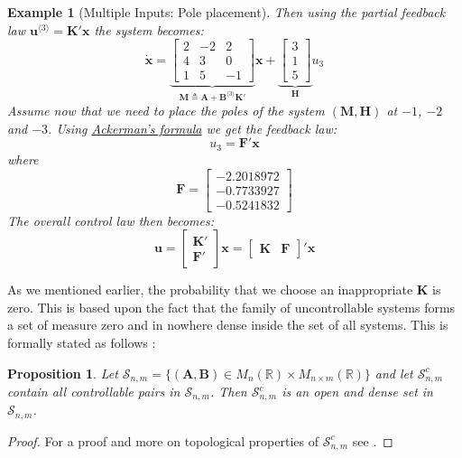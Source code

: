 \documentclass[a4paper,10pt,oneside]{book}
\newtheorem{example}{Example}
\newtheorem{proposition}[theorem]{Proposition}
\begin{document}
\begin{example}[Multiple Inputs: Pole placement]
Then using the partial feedback law $\mathbf{u}^{\langle3 \rangle}=\mathbf{K}'\mathbf{x}$ the system becomes:
\begin{equation}
 \dot{\mathbf{x}}=\underbrace{\left[ {\begin{array}{ccc}
      2&-2&2\\4&3&0\\1&5&-1
\end{array} } \right]}_{\mathbf{M}\triangleq\mathbf{A}+\mathbf{B}^{\langle3 \rangle}\mathbf{K}'}\mathbf{x}+\underbrace{\left[ {\begin{array}{c}     
3\\1\\5
\end{array} } \right]}_{\mathbf{H}}u_3
\end{equation}
Assume now that we need to place the poles of the system $(\mathbf{M},\mathbf{H})$ at $-1$, $-2$ and $-3$. Using \hyperlink{prop:AckermansFormula}{Ackerman's formula} we get the feedback law:
\begin{equation}
 u_3=\mathbf{F}'\mathbf{x}
\end{equation}
where
\begin{equation}
 \mathbf{F}=\left[ {\begin{array}{c}
      -2.2018972\\
      -0.7733927\\
      -0.5241832
\end{array} } \right]
\end{equation}
The overall control law then becomes:
\begin{equation}
 \mathbf{u}=\left[ {\begin{array}{c}
      \mathbf{K}' \\ \mathbf{F}'
\end{array} } \right]\mathbf{x}=\left[ {\begin{array}{cc}
      \mathbf{K} & \mathbf{F}
\end{array} } \right]'\mathbf{x}
\end{equation}
\end{example}
As we mentioned earlier, the probability that we choose an inappropriate $\mathbf{K}$ is zero. This is based upon the fact that the family of uncontrollable systems forms a set of measure zero and in nowhere dense inside the set of all systems. This is formally stated as follows \cite{Son98}:
\begin{proposition}
 Let $\mathcal{S}_{n,m}=\{(\mathbf{A},\mathbf{B})\in M_{n}(\mathbb{R})\times M_{n\times m}(\mathbb{R})\}$ and let $\mathcal{S}_{n,m}^{c}$ contain all controllable pairs in $\mathcal{S}_{n,m}$. Then $\mathcal{S}_{n,m}^{c}$ is an open and dense set in $\mathcal{S}_{n,m}$.
\end{proposition}
\begin{proof}
 For a proof and more on topological properties of $\mathcal{S}_{n,m}^{c}$ see \cite{Son98}.
\end{proof}
\end{document}
